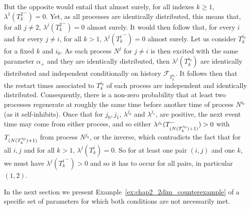 \begin{example}
        But the opposite would entail that almost surely, for all indexes \(k\ge1\), $\lambda^1({T_k^2}^-) = 0$.
        Yet, as all processes are identically distributed,
        this means that, for all $j\neq 2$, \(\lambda^j({T_k^2}^-) = 0\) almost surely.
        It would then follow that, for every $i$ and for every $j\neq i$, for all $k> 1$, $\lambda^j({T_k^i}^-) = 0$ almost surely. Let us consider $T_k^{i_0}$ for a fixed $k$ and $i_0$. As each process $N^j$ for $j\neq i$ is then excited with the same parameter $\alpha_+$ and they are identically distributed, then $\lambda^j(T_k^{i_0})$ are identically distributed and independent conditionally on history $\mathcal{F}_{T_k^{i_0}}$. It follows then that the restart times associated to $T_k^{i_0}$ of each process are independent and identically distributed. Consequently, there is a non-zero probability that at least two processes regenerate at roughly the same time before another time of process $N^{i_0}$ (as it self-inhibits). Once that for $j_0, j_1$, $\lambda^{j_0}$ and $\lambda^{j_1}$, are positive, the next event time may come from either process, and so either $\lambda^{j_1}(T\park[N(T_k^{i_0}) + 1]^-) > 0$ with $T\park[N(T_k^{i_0}) + 1]$ from process $N^{j_0}$, or the inverse, which contradicts the fact that for all $i,j$ and for all $k>1$, $\lambda^j(T_k^i) = 0$.
        So for at least one pair $(i, j)$ and one $k$, we must have $\lambda^{j}({T_k^{i}}^-) > 0$ and so it has to occur for all pairs, in particular $(1, 2)$.

    \end{example}

    In the next section we present Example~\ref{ex:chap2_2dim_counterexample} of a specific set of parameters for which both conditions are not necessarily met.

